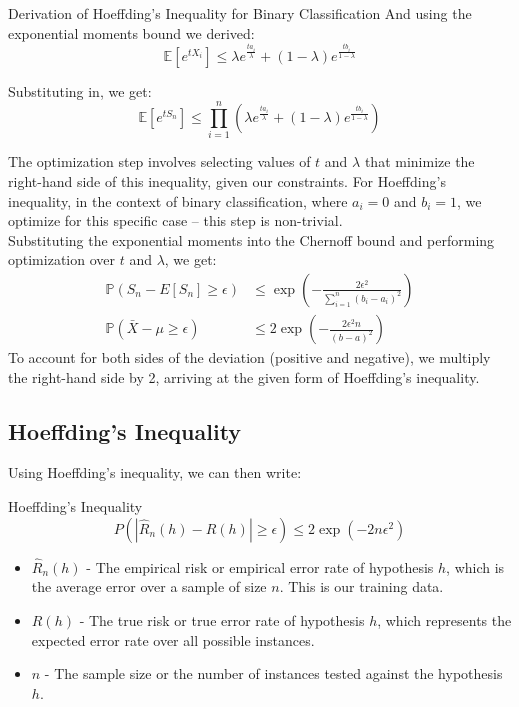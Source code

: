 \begin{sidenotebox}{Derivation of Hoeffding's Inequality for Binary Classification}
And using the exponential moments bound we derived:
\[ \mathbb{E}[e^{tX_i}] \leq \lambda e^{\frac{ta_i}{\lambda}} + (1-\lambda)e^{\frac{tb_i}{1-\lambda}} \]

Substituting in, we get:
\[ \mathbb{E}[e^{tS_n}] \leq \prod_{i=1}^{n} \left( \lambda e^{\frac{ta_i}{\lambda}} + (1-\lambda)e^{\frac{tb_i}{1-\lambda}} \right) \]

The optimization step involves selecting values of \(t\) and \(\lambda\) that minimize the right-hand side of this inequality, given our constraints. For Hoeffding's inequality, in the context of binary classification, where \(a_i = 0\) and \(b_i = 1\), we optimize for this specific case – this step is non-trivial.\\


Substituting the exponential moments into the Chernoff bound and performing optimization over \(t\) and \(\lambda\), we get:
\begin{align*}
\mathbb{P}(S_n - E[S_n] \geq \epsilon) &\leq \exp\left(-\frac{2\epsilon^2}{\sum_{i=1}^{n} (b_i - a_i)^2}\right)\\
\mathbb{P}(\bar{X} - \mu \geq \epsilon) &\leq 2\exp\left(-\frac{2\epsilon^2n}{(b - a)^2}\right)
\end{align*}
To account for both sides of the deviation (positive and negative), we multiply the right-hand side by 2, arriving at the given form of Hoeffding's inequality.
\end{sidenotebox}


\subsection{Hoeffding's Inequality}
Using Hoeffding's inequality, we can then write:

\begin{definitionbox}{Hoeffding's Inequality}
\[
P\left(\left|\widehat{R}_n(h) - R(h)\right| \geq \epsilon\right) \leq 2\exp\left(-2n\epsilon^2\right)
\]

\begin{itemize}
    \item \(\widehat{R}_n(h)\) - The empirical risk or empirical error rate of hypothesis \(h\), which is the average error over a sample of size \(n\). This is our training data.
    \item \(R(h)\) - The true risk or true error rate of hypothesis \(h\), which represents the expected error rate over all possible instances.
    \item \(n\) - The sample size or the number of instances tested against the hypothesis \(h\).
\end{itemize}


\end{definitionbox}

